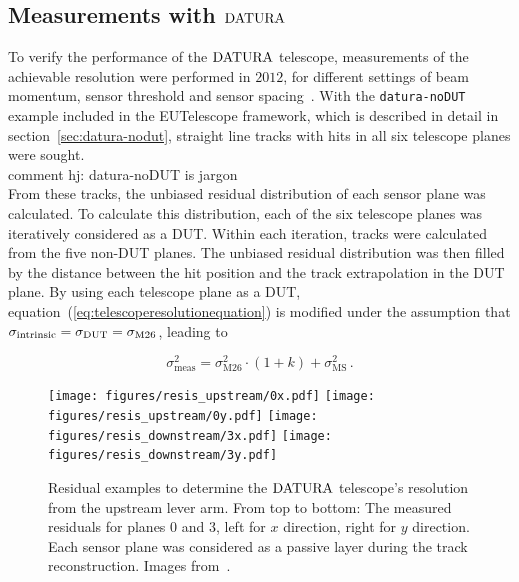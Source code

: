 \subsection{Measurements with $\Datura$}

To verify the performance of the $\Datura$ telescope, measurements of the achievable resolution were performed in $2012$, for different settings of beam momentum,
 sensor threshold and sensor spacing~\cite{ref:thomas}.
With the \texttt{datura-noDUT} example included in the {EUTelescope} framework, which is described in detail in section~\ref{sec:datura-nodut},
 straight line tracks with hits in all six telescope planes were sought. 
 \\{comment hj: datura-noDUT is jargon}\\
From these tracks, the unbiased residual distribution of each sensor plane was calculated.
To calculate this distribution, each of the six telescope planes was iteratively considered as a DUT.
Within each iteration, tracks were calculated from the five non-DUT planes.
The unbiased residual distribution was then filled by the distance between the hit position and the track extrapolation in the DUT plane.
By using each telescope plane as a DUT, equation~(\ref{eq:telescoperesolutionequation}) is modified under the assumption that $\sigma_{\textrm{intrinsic}} = \sigma_{\textrm{DUT}} = \sigma_{\textrm{M26}}$,
 leading to

\begin{equation}
\label{eq:telescoperesolutionequation_2}
\sigma_{\textrm{meas}}^2 = \sigma_{\textrm{M26}}^2 \cdot \left( 1 + k \right) +
\sigma_{\textrm{MS}}^2\,.
\end{equation}

\begin{figure}[tb]
  \centering
  \texttt{[image: figures/resis\_upstream/0x.pdf]}
  \texttt{[image: figures/resis\_upstream/0y.pdf]}
  \texttt{[image: figures/resis\_downstream/3x.pdf]}
  \texttt{[image: figures/resis\_downstream/3y.pdf]}
  \caption[Residual examples to determine the $\Datura$ telescope's resolution~\cite{ref:thomas}]{Residual examples to determine the $\Datura$ telescope's resolution from the upstream lever arm.
From top to bottom: The measured residuals for planes $0$ and $3$, left for $x$ direction, right for $y$ direction.
Each sensor plane was considered as a passive layer during the track reconstruction. Images from~\cite{ref:thomas}.}
  \label{fig:residualexample1}
\end{figure}

